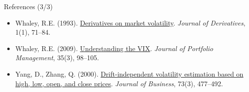 \begin{frame}{References (3/3)}
\begin{itemize}
    \item Whaley, R.E. (1993). \href{https://doi.org/10.3905/jod.1993.407868}{Derivatives on market volatility}. \textit{Journal of Derivatives}, 1(1), 71--84.
    \item Whaley, R.E. (2009). \href{https://doi.org/10.3905/JPM.2009.35.3.098}{Understanding the VIX}. \textit{Journal of Portfolio Management}, 35(3), 98--105.
    \item Yang, D., Zhang, Q. (2000). \href{https://doi.org/10.1086/209650}{Drift-independent volatility estimation based on high, low, open, and close prices}. \textit{Journal of Business}, 73(3), 477--492.
\end{itemize}
\end{frame}


